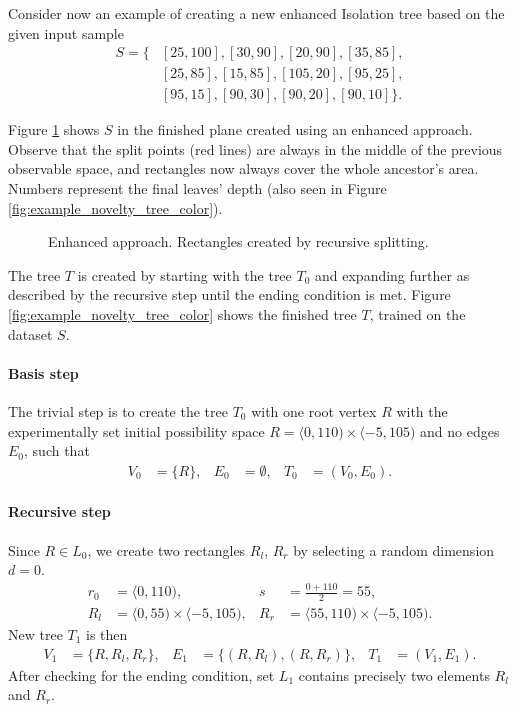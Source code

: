 \begin{example}
\label{example:novelty_tree_create}
Consider now an example of creating a new enhanced Isolation tree based on the given input sample
\begin{align*}
    S = \{&[25,100],[30,90],[20,90],[35,85],\\
    &[25,85],[15,85],[105,20],[95,25], \\
    &[95,15],[90,30],[90,20],[90,10]\}.
\end{align*}

Figure \ref{fig:example_novelty_gnu} shows $S$ in the finished plane created using an enhanced approach. Observe that the split points (red lines) are always in the middle of the previous observable space, and rectangles now always cover the whole ancestor's area. Numbers represent the final leaves' depth (also seen in Figure \ref{fig:example_novelty_tree_color}).

\begin{figure}[htbp]
\centering

\caption{Enhanced approach. Rectangles created by recursive splitting.}
\label{fig:example_novelty_gnu}
\end{figure}

The tree $T$ is created by starting with the tree $T_0$ and expanding further as described by the recursive step until the ending condition is met.
Figure \ref{fig:example_novelty_tree_color} shows the finished tree $T$, trained on the dataset $S$.

\paragraph{Basis step} 
The trivial step is to create the tree $T_0$ with one root vertex $R$ with the experimentally set initial possibility space  $R= \langle 0,110) \times \langle -5,105)$ and no edges $E_0$, such that
    \begin{align*}
        V_0 &= \{R\},&
        E_0 &= \emptyset,&
        T_0 &= (V_0, E_0).
    \end{align*}

\paragraph{Recursive step}
     Since $R \in L_0$, we create two rectangles $R_l$, $R_r$ by selecting a random dimension $d=0$.
    \begin{align*}
        r_0 &= \langle 0, 110), &
        s &= \frac{0 + 110}{2} = 55, \\
        R_l &= \langle 0, 55) \times \langle -5,105), &
        R_r &= \langle 55, 110) \times \langle -5,105).
    \end{align*}
     New tree $T_1$ is then
    \begin{align*}
    V_1 &= \{R, R_l, R_r\}, &
    E_1 &= \{(R, R_l), (R, R_r)\}, &
    T_1 &= (V_1, E_1).
    \end{align*}
    After checking for the ending condition, set $L_1$ contains precisely two elements $R_l$ and $R_r$.
     

\end{example}
